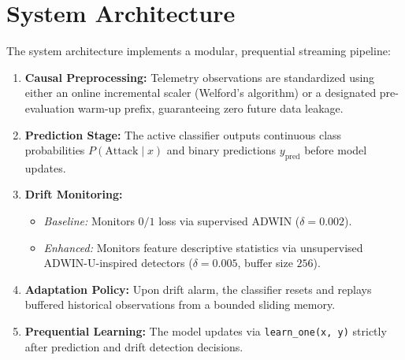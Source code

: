 \documentclass[conference]{IEEEtran}
\begin{document}
\section{System Architecture}
The system architecture implements a modular, prequential streaming pipeline:
\begin{enumerate}
    \item \textbf{Causal Preprocessing:} Telemetry observations are standardized using either an online incremental scaler (Welford's algorithm) or a designated pre-evaluation warm-up prefix, guaranteeing zero future data leakage.
    \item \textbf{Prediction Stage:} The active classifier outputs continuous class probabilities $P(\text{Attack} \mid x)$ and binary predictions $y_{\text{pred}}$ before model updates.
    \item \textbf{Drift Monitoring:}
    \begin{itemize}
        \item \emph{Baseline:} Monitors $0/1$ loss via supervised ADWIN ($\delta = 0.002$).
        \item \emph{Enhanced:} Monitors feature descriptive statistics via unsupervised ADWIN-U-inspired detectors ($\delta = 0.005$, buffer size $256$).
    \end{itemize}
    \item \textbf{Adaptation Policy:} Upon drift alarm, the classifier resets and replays buffered historical observations from a bounded sliding memory.
    \item \textbf{Prequential Learning:} The model updates via \texttt{learn\_one(x, y)} strictly after prediction and drift detection decisions.
\end{enumerate}
\end{document}
